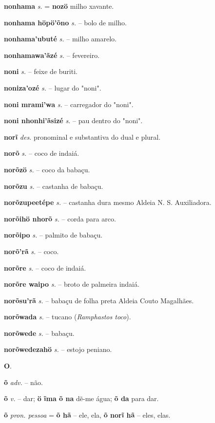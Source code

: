 \textbf{nonhama} \textit{s.} = \textbf{nozö} milho xavante.

\textbf{nonhama höpö'õno} \textit{s.} -- bolo de milho.

\textbf{nonhama'ubuté} \textit{s.} -- milho amarelo.

\textbf{nonhamawa'ãzé} \textit{s.} -- fevereiro.

\textbf{noni} \textit{s.} -- feixe de buriti.

\textbf{noniza'ozé} \textit{s.} -- lugar do "noni".

\textbf{noni mrami'wa} \textit{s.} -- carregador do "noni".

\textbf{noni nhonhi'ãsizé} \textit{s.} -- pau dentro do "noni".

\textbf{norĩ} \textit{des.} pronominal e substantiva do dual e plural.

\textbf{norõ} \textit{s.} -- coco de indaiá.

\textbf{norõzö} \textit{s.} -- coco da babaçu.

\textbf{norõzu} \textit{s.} -- castanha de babaçu.

\textbf{norõzupeetépe} \textit{s.} -- castanha dura mesmo  Aldeia N. S. Auxiliadora.

\textbf{norõihö nhorõ} \textit{s.} -- corda para arco.

\textbf{norõipo} \textit{s.} -- palmito de babaçu.

\textbf{norõ'rã} \textit{s.} -- coco.

\textbf{norõre} \textit{s.} -- coco de indaiá.

\textbf{norõre waipo} \textit{s.} -- broto de palmeira indaiá.

\textbf{norõsu'rã} \textit{s.} -- babaçu de folha preta  Aldeia Couto Magalhães.

\textbf{norõwada} \textit{s.} -- tucano (\textit{Ramphastos toco}).

\textbf{norõwede} \textit{s.} -- babaçu.

\textbf{norõwedezahö} \textit{s.} -- estojo peniano.



\textbf{O}.



\textbf{õ} \textit{adv.} -- não.

\textbf{õ} \textit{v.} -- dar; \textbf{ö ĩma õ na} dẽ-me água; \textbf{õ da} para dar.

\textbf{õ} \textit{pron. pessoa} = \textbf{õ hã} -- ele, ela, \textbf{õ norĩ hã} -- eles, elas.

